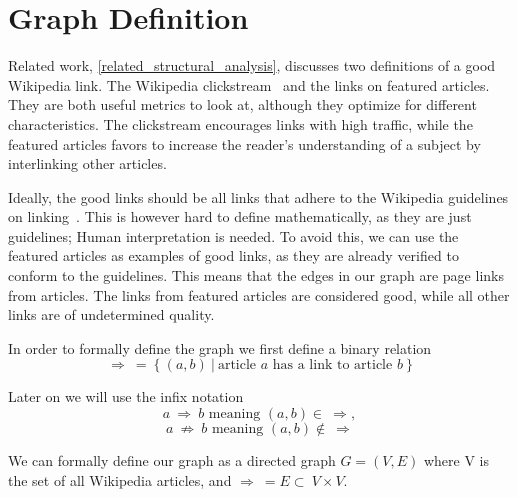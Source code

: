 \section{Graph Definition}

Related work, \cref{related_structural_analysis}, discusses two definitions of a good Wikipedia link. The Wikipedia clickstream~\cite{wiki-clickstream} and the links on featured articles. They are both useful metrics to look at, although they optimize for different characteristics. The clickstream encourages links with high traffic, while the featured articles favors to increase the reader's understanding of a subject by interlinking other articles.

Ideally, the good links should be all links that adhere to the Wikipedia guidelines on linking~\cite{wiki-manual-of-style-guidelines}. This is however hard to define mathematically, as they are just guidelines; Human interpretation is needed. To avoid this, we can use the featured articles as examples of good links, as they are already verified to conform to the guidelines. This means that the edges in our graph are page links from articles. The links from featured articles are considered good, while all other links are of undetermined quality.

In order to formally define the graph we first define a binary relation $$\Rightarrow\ =\ \{\ (a,b)\ |\ \text{article } a \text{ has a link to article } b\ \}$$

Later on we will use the infix notation $$a\ \Rightarrow\ b \text{ meaning } (a,b) \in\ \Rightarrow,$$ $$a\ \not\Rightarrow\ b \text{ meaning } (a,b) \not\in\ \Rightarrow$$

We can formally define our graph as a directed graph $G = (V,E)$ where V is the set of all Wikipedia articles, and $\Rightarrow\ = E\subset\ V \times V$.

